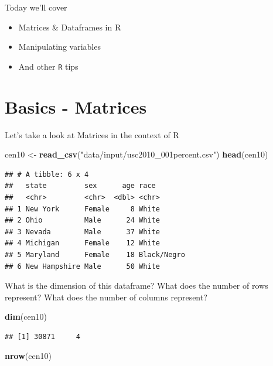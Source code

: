\documentclass[]{book}
\newenvironment{Shaded}{\begin{snugshade}}{\end{snugshade}}
\newcommand{\KeywordTok}[1]{\textcolor[rgb]{0.13,0.29,0.53}{\textbf{#1}}}
\newcommand{\StringTok}[1]{\textcolor[rgb]{0.31,0.60,0.02}{#1}}
\newcommand{\NormalTok}[1]{#1}
\providecommand{\tightlist}{%
  \setlength{\itemsep}{0pt}\setlength{\parskip}{0pt}}
\theoremstyle{definition}
\theoremstyle{definition}
\theoremstyle{definition}
\theoremstyle{remark}
\begin{document}
Today we'll cover

\begin{itemize}
\tightlist
\item
  Matrices \& Dataframes in R
\item
  Manipulating variables
\item
  And other \texttt{R} tips
\end{itemize}

\section{Basics - Matrices}\label{basics---matrices}

Let's take a look at Matrices in the context of R

\begin{Shaded}
\begin{Highlighting}[]
\NormalTok{cen10 <-}\StringTok{ }\KeywordTok{read_csv}\NormalTok{(}\StringTok{"data/input/usc2010_001percent.csv"}\NormalTok{)}
\KeywordTok{head}\NormalTok{(cen10)}
\end{Highlighting}
\end{Shaded}

\begin{verbatim}
## # A tibble: 6 x 4
##   state         sex      age race       
##   <chr>         <chr>  <dbl> <chr>      
## 1 New York      Female     8 White      
## 2 Ohio          Male      24 White      
## 3 Nevada        Male      37 White      
## 4 Michigan      Female    12 White      
## 5 Maryland      Female    18 Black/Negro
## 6 New Hampshire Male      50 White
\end{verbatim}

What is the dimension of this dataframe? What does the number of rows
represent? What does the number of columns represent?

\begin{Shaded}
\begin{Highlighting}[]
\KeywordTok{dim}\NormalTok{(cen10)}
\end{Highlighting}
\end{Shaded}

\begin{verbatim}
## [1] 30871     4
\end{verbatim}

\begin{Shaded}
\begin{Highlighting}[]
\KeywordTok{nrow}\NormalTok{(cen10)}
\end{Highlighting}
\end{Shaded}
\end{document}
